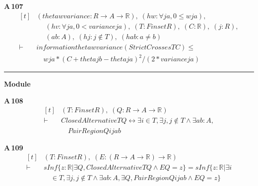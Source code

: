 \noindent\textbf{A\,107}\quad{}
{\footnotesize\[ \begin{aligned}[t]
&(\mathit{theta} \mathit{w} \mathit{variance} : \mathit{R} \to \mathit{A} \to \mathbb{R} ),\; (\mathit{hw} : \forall \mathit{j} \mathit{a},0 \leq \mathit{w} \mathit{j} \mathit{a}),\\
&\quad \; (\mathit{hv} : \forall \mathit{j} \mathit{a},0 < \mathit{variance} \mathit{j} \mathit{a}),\; (\mathit{T} : \mathit{Finset} \mathit{R}),\; (\mathit{C} : \mathbb{R} ),\; (\mathit{j} : \mathit{R}),\\
&\quad \; (\mathit{a} \mathit{b} : \mathit{A}),\; (\mathit{hj} : \mathit{j} \notin \mathit{T}),\; (\mathit{hab} : \mathit{a} \neq \mathit{b})\\
\vdash\;&\mathit{information} \mathit{theta} \mathit{w} \mathit{variance} (\mathit{StrictCrosses} \mathit{T} \mathit{C}) \leq\\
&\quad \mathit{w} \mathit{j} \mathit{a}*(\mathit{C}+\mathit{theta} \mathit{j} \mathit{b}-\mathit{theta} \mathit{j} \mathit{a})^{2}/(2*\mathit{variance} \mathit{j} \mathit{a})
\end{aligned} \]}

\vspace{4pt}\noindent\rule{\columnwidth}{0.4pt}\par\vspace{2pt}
\noindent\textbf{Module }\par\vspace{3pt}

\noindent\textbf{A\,108}\quad{}
{\footnotesize\[ \begin{aligned}[t]
&(\mathit{T} : \mathit{Finset} \mathit{R}),\; (\mathit{Q} : \mathit{R} \to \mathit{A} \to \mathbb{R} )\\
\vdash\;&\mathit{ClosedAlternative} \mathit{T} \mathit{Q} \leftrightarrow \exists \mathit{i} \in \mathit{T}, \exists \mathit{j}, \mathit{j} \notin \mathit{T} \wedge \exists \mathit{a} \mathit{b} : \mathit{A},\\
&\quad \mathit{PairRegion} \mathit{Q} \mathit{i} \mathit{j} \mathit{a} \mathit{b}
\end{aligned} \]}

\noindent\textbf{A\,109}\quad{}
{\footnotesize\[ \begin{aligned}[t]
&(\mathit{T} : \mathit{Finset} \mathit{R}),\; (\mathit{E} : (\mathit{R} \to \mathit{A} \to \mathbb{R} ) \to \mathbb{R} )\\
\vdash\;&\mathit{sInf} \{ \mathit{z} : \mathbb{R} | \exists \mathit{Q}, \mathit{ClosedAlternative} \mathit{T} \mathit{Q} \wedge \mathit{E} \mathit{Q} = \mathit{z}\} = \mathit{sInf} \{ \mathit{z} : \mathbb{R} | \exists \mathit{i}\\
&\quad \in \mathit{T}, \exists \mathit{j}, \mathit{j} \notin \mathit{T} \wedge \exists \mathit{a} \mathit{b} : \mathit{A}, \exists \mathit{Q}, \mathit{PairRegion} \mathit{Q} \mathit{i} \mathit{j} \mathit{a} \mathit{b} \wedge \mathit{E} \mathit{Q} = \mathit{z}\}
\end{aligned} \]}

